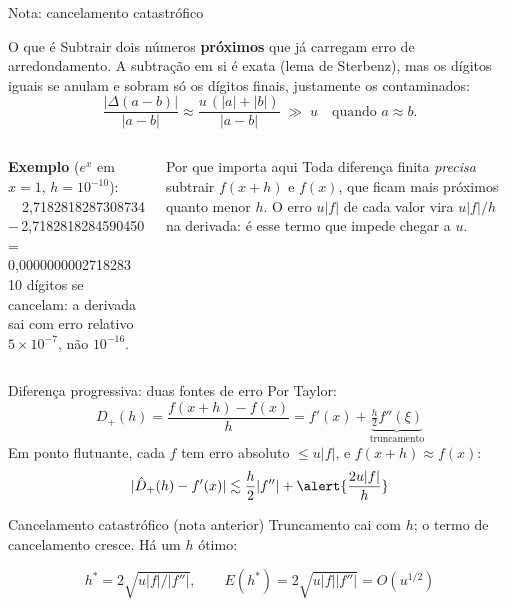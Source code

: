 \documentclass[aspectratio=169,11pt]{beamer}
\begin{document}
\begin{frame}{Nota: cancelamento catastrófico}
  \begin{block}{O que é}
    Subtrair dois números \textbf{próximos} que já carregam erro de arredondamento. A subtração em si é exata (lema de Sterbenz), mas os dígitos iguais se anulam e sobram só os dígitos finais, justamente os contaminados:
    \[
      \frac{|\Delta(a-b)|}{|a-b|} \approx \frac{u\,(|a|+|b|)}{|a-b|} \;\gg\; u \quad\text{quando } a\approx b.
    \]
  \end{block}
  \vspace{0.2em}
  \begin{columns}[T]
    \textbf{Exemplo} ($e^x$ em $x=1$, $h=10^{-10}$):\\[0.2em]
    {\small\ttfamily
    \ \ 2,718281828\alert{7308734}\\
    $-$\,2,718281828\alert{4590450}\\
    = 0,000000000\alert{2718283}}\\[0.3em]
    {\small 10 dígitos se cancelam: a derivada sai com erro relativo $5\times10^{-7}$, não $10^{-16}$.}
    \begin{alertblock}{Por que importa aqui}
      Toda diferença finita \emph{precisa} subtrair $f(x+h)$ e $f(x)$, que ficam mais próximos quanto menor $h$. O erro $u|f|$ de cada valor vira $u|f|/h$ na derivada: é esse termo que impede chegar a $u$.
    \end{alertblock}
  \end{columns}
\end{frame}

\begin{frame}{Diferença progressiva: duas fontes de erro}
  Por Taylor:
  \[
    D_+(h) = \frac{f(x+h)-f(x)}{h} = f'(x) + \underbrace{\tfrac{h}{2}f''(\xi)}_{\text{truncamento}}
  \]
  Em ponto flutuante, cada $f$ tem erro absoluto $\le u|f|$, e $f(x+h)\approx f(x)$:
  \[
    |\hat D_+(h)-f'(x)| \lesssim \frac{h}{2}|f''| + \alert{\frac{2u|f|}{h}}
  \]
  \begin{alertblock}{Cancelamento catastrófico (nota anterior)}
    Truncamento cai com $h$; o termo de cancelamento cresce. Há um $h$ ótimo:
  \end{alertblock}
  \[
    h^\ast = 2\sqrt{u|f|/|f''|},\qquad E(h^\ast) = 2\sqrt{u|f||f''|} = O(u^{1/2})
  \]
\end{frame}
\end{document}
